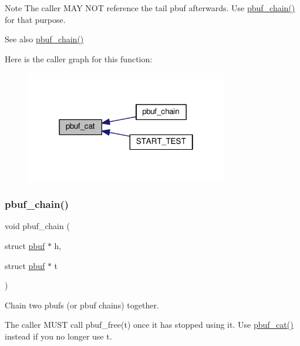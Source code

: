\begin{DoxyNote}{Note}
The caller M\+AY N\+OT reference the tail pbuf afterwards. Use \hyperlink{group__pbuf_ga831c9a72bda1d3bd4c7b96f5a0e3b891}{pbuf\+\_\+chain()} for that purpose.
\end{DoxyNote}
\begin{DoxySeeAlso}{See also}
\hyperlink{group__pbuf_ga831c9a72bda1d3bd4c7b96f5a0e3b891}{pbuf\+\_\+chain()} 
\end{DoxySeeAlso}
Here is the caller graph for this function\+:
\nopagebreak
\begin{figure}[H]
\begin{center}
\leavevmode
\includegraphics[width=250pt]{group__pbuf_ga82429084fe29015509c9b4a072707cd4_icgraph}
\end{center}
\end{figure}
\mbox{\label{group__pbuf_ga831c9a72bda1d3bd4c7b96f5a0e3b891}} 
\subsubsection{\texorpdfstring{pbuf\+\_\+chain()}{pbuf\_chain()}}
{\footnotesize\ttfamily void pbuf\+\_\+chain (\begin{DoxyParamCaption}\item[{struct \hyperlink{structpbuf}{pbuf} $\ast$}]{h,  }\item[{struct \hyperlink{structpbuf}{pbuf} $\ast$}]{t }\end{DoxyParamCaption})}

Chain two pbufs (or pbuf chains) together.

The caller M\+U\+ST call pbuf\+\_\+free(t) once it has stopped using it. Use \hyperlink{group__pbuf_ga82429084fe29015509c9b4a072707cd4}{pbuf\+\_\+cat()} instead if you no longer use t.


